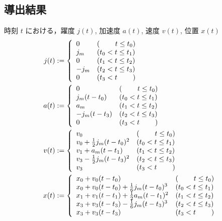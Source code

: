 \documentclass[a5paper]{ltjsarticle}
\begin{document}
\subsection{導出結果}
時刻 $t$ における，躍度 $j(t)$, 加速度 $a(t)$, 速度 $v(t)$, 位置 $x(t)$
\begin{align}
    j(t)
     & :=
    \left\{ \begin{array}{ll}
        0    & (\hspace{2.2em}t \le t_0) \\
        j_m  & (t_0 < t \le t_1)         \\
        0    & (t_1 < t \le t_2)         \\
        -j_m & (t_2 < t \le t_3)         \\
        0    & (t_3 < t \hspace{2.2em})
    \end{array} \right.
    \\
    a(t)
     & :=
    \left\{ \begin{array}{ll}
        0           & (\hspace{2.2em}t \le t_0) \\
        j_m(t-t_0)  & (t_0 < t \le t_1)         \\
        a_m         & (t_1 < t \le t_2)         \\
        -j_m(t-t_3) & (t_2 < t \le t_3)         \\
        0           & (t_3 < t \hspace{2.2em})
    \end{array} \right.
    \\
    v(t)
     & :=
    \left\{ \begin{array}{ll}
        v_0                           & (\hspace{2.2em} t \le t_0) \\
        v_0 + \frac{1}{2}j_m(t-t_0)^2 & (t_0 < t \le t_1)          \\
        v_1 + a_m(t-t_1)              & (t_1 < t \le t_2)          \\
        v_3 - \frac{1}{2}j_m(t-t_3)^2 & (t_2 < t \le t_3)          \\
        v_3                           & (t_3 < t \hspace{2.2em})
    \end{array} \right.
    \\
    x(t)
     & :=
    \left\{ \begin{array}{ll}
        x_0 + v_0(t-t_0)                           & (\hspace{2.2em} t \le t_0) \\
        x_0 + v_0(t-t_0) + \frac{1}{6}j_m(t-t_0)^3 & (t_0 < t \le t_1)          \\
        x_1 + v_1(t-t_1) + \frac{1}{2}a_m(t-t_1)^2 & (t_1 < t \le t_2)          \\
        x_3 + v_3(t-t_3) - \frac{1}{6}j_m(t-t_3)^3 & (t_2 < t \le t_3)          \\
        x_3 + v_3(t-t_3)                           & (t_3 < t \hspace{2.2em})
    \end{array} \right.
\end{align}
\end{document}
